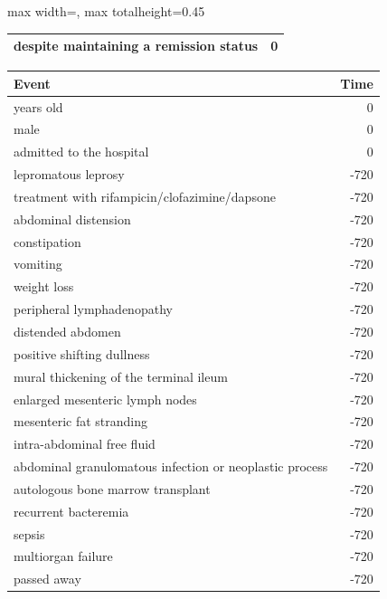 \begin{ChSixUncaptionedFigure}
\begin{ChSixFloatBody}
\begin{adjustbox}{max width=\linewidth, max totalheight=0.45\textheight}
\begin{tcolorbox}
\begin{minipage}[t]{0.49\textwidth}
\begin{tcolorbox}[ChSix/annobox,title={Mixtral-8x7B-Instruct v0.1 annotation}]
\begin{tabular}{>{\raggedright\arraybackslash}p{} r}
despite maintaining a remission status & 0 \\
\bottomrule
\end{tabular}
\end{tcolorbox}
\end{minipage}
\hfill
\begin{minipage}[t]{0.49\textwidth}\vspace{0pt}
\begin{tcolorbox}[ChSix/annobox,title={Llama-3.1-8B-Instruct annotation}]
\ChSixAnnotationTableStyle
\begin{tabular}{>{\raggedright\arraybackslash}p{} r}
\toprule
\textbf{Event} & \textbf{Time} \\
\midrule
18 years old & 0 \\
male & 0 \\
admitted to the hospital & 0 \\
lepromatous leprosy & -720 \\
treatment with rifampicin/clofazimine/dapsone & -720 \\
abdominal distension & -720 \\
constipation & -720 \\
vomiting & -720 \\
weight loss & -720 \\
peripheral lymphadenopathy & -720 \\
distended abdomen & -720 \\
positive shifting dullness & -720 \\
mural thickening of the terminal ileum & -720 \\
enlarged mesenteric lymph nodes & -720 \\
mesenteric fat stranding & -720 \\
intra-abdominal free fluid & -720 \\
abdominal granulomatous infection or neoplastic process & -720 \\
autologous bone marrow transplant & -720 \\
recurrent bacteremia & -720 \\
sepsis & -720 \\
multiorgan failure & -720 \\
passed away & -720 \\
\bottomrule
\end{tabular}
\end{tcolorbox}
\end{minipage}

\end{tcolorbox}
\end{adjustbox}

\end{ChSixFloatBody}
\end{ChSixUncaptionedFigure}